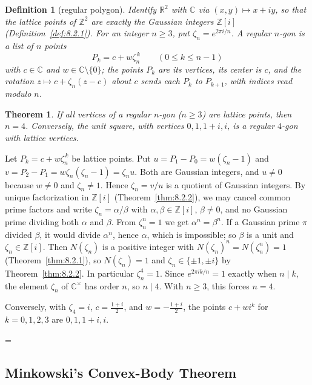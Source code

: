 \documentclass[11pt]{article}
\makeatletter
\theoremstyle{ntstyle}
\newtheorem{theorem}{Theorem}[subsection]
\newtheorem{definition}{Definition}[subsection]
\let\nt@closedisplay\]
\def\nt@guardedclose{\@ifnextchar\par{\nt@closeafterpar}{\@ifnextchar\end{\postdisplaypenalty\@M\nt@closedisplay}{\nt@closedisplay}}}
\def\nt@closeafterpar\par{\@ifnextchar\par{\nt@closeafterpar}{\@ifnextchar\end{\postdisplaypenalty\@M\nt@closedisplay\par}{\nt@closedisplay\par}}}
\renewenvironment{proof}[1][\proofname]{\par
  \pushQED{\qed}\normalfont\topsep\medskipamount\edef\nt@afterproof{\@endparpenalty=\the\@endparpenalty\relax}\@beginparpenalty\@M\@endparpenalty\@M\let\]\nt@guardedclose\trivlist\item[]\textit{#1\@addpunct{.}} \ignorespaces}{\ifvmode\addpenalty\@M\fi\popQED\nt@afterproof\endtrivlist\@endpefalse}
\makeatother
\begin{document}
\begin{definition}[regular polygon]\label{def:10.10.1} Identify $\mathbb{R}^2$
	with $\mathbb{C}$ via $(x,y)\mapsto x+iy$, so that the lattice points of
	$\mathbb{Z}^2$ are exactly the Gaussian integers $\mathbb{Z}[i]$
	(Definition~\ref{def:8.2.1}). For an integer $n\ge3$, put
	$\zeta_n=e^{2\pi i/n}$. A regular $n$-gon is a list of $n$ points
	\[
		P_k=c+w\zeta_n^{\,k}\qquad(0\le k\le n-1)
	\]
	with $c\in\mathbb{C}$ and $w\in\mathbb{C}\setminus\{0\}$; the points $P_k$
	are its vertices, its center is $c$,
	and the rotation $z\mapsto c+\zeta_n(z-c)$ about $c$ sends each $P_k$ to
	$P_{k+1}$, with indices read modulo $n$.

\end{definition}
\begin{theorem}\label{thm:10.10.1} If all vertices of a regular $n$-gon
	($n\ge3$) are lattice points, then $n=4$. Conversely, the unit square, with
	vertices $0,1,1+i,i$, is a regular $4$-gon with lattice vertices.

\end{theorem}

\begin{proof} Let $P_k=c+w\zeta_n^{\,k}$ be lattice points. Put
	$u=P_1-P_0=w(\zeta_n-1)$ and $v=P_2-P_1=w\zeta_n(\zeta_n-1)=\zeta_n u$. Both
	are Gaussian integers, and $u\neq0$ because $w\neq0$ and $\zeta_n\neq1$.
	Hence $\zeta_n=v/u$ is a quotient of Gaussian integers. By unique
	factorization in $\mathbb{Z}[i]$ (Theorem~\ref{thm:8.2.2}), we may cancel
	common prime factors and write $\zeta_n=\alpha/\beta$ with
	$\alpha,\beta\in\mathbb{Z}[i]$, $\beta\neq0$, and no Gaussian prime dividing
	both $\alpha$ and $\beta$. From $\zeta_n^n=1$ we get $\alpha^n=\beta^n$. If a
	Gaussian prime $\pi$ divided $\beta$, it would divide $\alpha^n$, hence
	$\alpha$, which is impossible; so $\beta$ is a unit and
	$\zeta_n\in\mathbb{Z}[i]$. Then $N(\zeta_n)$ is a positive integer with
	$N(\zeta_n)^n=N(\zeta_n^n)=1$ (Theorem~\ref{thm:8.2.1}), so $N(\zeta_n)=1$
	and $\zeta_n\in\{\pm1,\pm i\}$ by Theorem~\ref{thm:8.2.2}. In particular
	$\zeta_n^4=1$. Since $e^{2\pi ik/n}=1$ exactly when $n\mid k$, the element
	$\zeta_n$ of $\mathbb{C}^{\times}$ has order $n$, so $n\mid4$. With $n\ge3$,
	this forces $n=4$.

	Conversely, with $\zeta_4=i$, $c=\frac{1+i}{2}$, and $w=-\frac{1+i}{2}$, the
	points $c+wi^k$ for $k=0,1,2,3$ are $0,1,1+i,i$.

\end{proof}
\subsection{Minkowski's Convex-Body Theorem}
\end{document}
